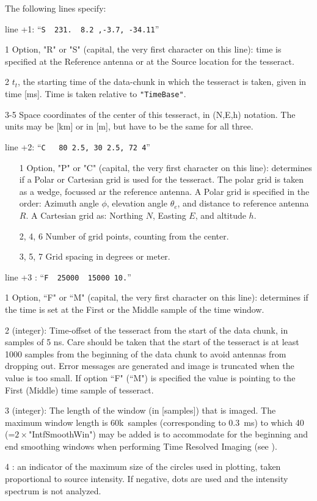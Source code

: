 The following lines specify:
\begin{enumerate*}
\item[line +1:]   ``\verb#S  231.  8.2 ,-3.7, -34.11#''
   \begin{enumerate*}
   \item[1] Option, "R" or "S" (capital, the very first character on this line): time is specified at the Reference antenna or at the Source location for the tesseract.
   \item[2] $t_t$, the starting time of the data-chunk in which the tesseract is taken, given in time [ms]. Time is taken relative to \verb!"TimeBase"!.
   \item[3-5] Space coordinates of the center of this tesseract, in (N,E,h) notation. The units may be [km] or in [m], but have to be the same for all three.
   \end{enumerate*}
\item[line +2:]   ``\verb#C   80 2.5, 30 2.5, 72 4#''
   \begin{enumerate}
   \item[1] Option, "P" or "C" (capital, the very first character on this line): determines if a Polar or Cartesian grid is used for the tesseract. The polar grid is taken as a wedge, focussed ar the reference antenna. A Polar grid is specified in the order: Azimuth angle $\phi$, elevation angle $\theta_e$, and distance to reference antenna $R$. A Cartesian grid as: Northing $N$, Easting $E$, and altitude $h$.
   \item[2, 4, 6] Number of grid points, counting from the center.
   \item[3, 5, 7] Grid spacing in degrees or meter.
   \end{enumerate}
\item[line +3]:   ``\verb#F  25000  15000 10.#''
   \item[1] Option, ``F" or ``M" (capital, the very first character on this line): determines if the time is set at the First or the Middle sample of the time window.
   \item[2] (integer): Time-offset of the tesseract from the start of the data chunk, in samples of 5 ns. Care should be taken that the start of the tesseract is at least 1000 samples from the beginning of the data chunk to avoid antennas from dropping out. Error messages are generated and image is truncated when the value is too small. If option ``F" (``M") is specified the value is pointing to the First (Middle) time sample of tesseract.
   \item[3] (integer): The length of the window (in [samples]) that is imaged. The maximum window length is 60k~samples (corresponding to 0.3~ms) to which 40 (=$2\times$"IntfSmoothWin") may be added is to accommodate for the beginning and end smoothing windows when performing Time Resolved Imaging (see ).
   \item[4] : an indicator of the maximum size of the circles used in plotting, taken proportional to source intensity. If negative, dots are used and the intensity spectrum is not analyzed.
\end{enumerate*}



